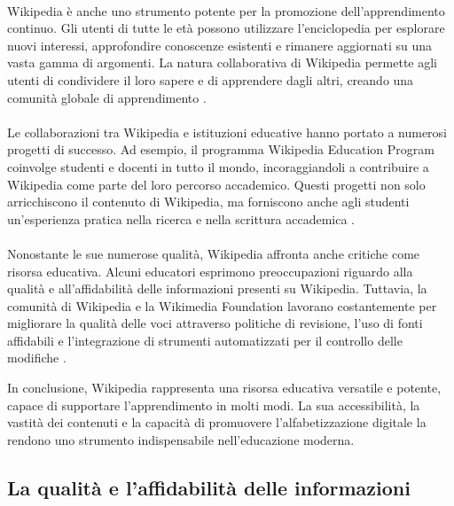 \documentclass[12pt,a4paper]{report}
\begin{document}
\paragraph*{}
Wikipedia è anche uno strumento potente per la promozione dell'apprendimento continuo. Gli utenti di tutte le età possono utilizzare l'enciclopedia per esplorare nuovi interessi, approfondire conoscenze esistenti e rimanere aggiornati su una vasta gamma di argomenti. La natura collaborativa di Wikipedia permette agli utenti di condividere il loro sapere e di apprendere dagli altri, creando una comunità globale di apprendimento \cite{history_of_wikis}.

\paragraph*{}
Le collaborazioni tra Wikipedia e istituzioni educative hanno portato a numerosi progetti di successo. Ad esempio, il programma Wikipedia Education Program coinvolge studenti e docenti in tutto il mondo, incoraggiandoli a contribuire a Wikipedia come parte del loro percorso accademico. Questi progetti non solo arricchiscono il contenuto di Wikipedia, ma forniscono anche agli studenti un'esperienza pratica nella ricerca e nella scrittura accademica \cite{jemielniak2014wikipedia}.

\paragraph*{}
Nonostante le sue numerose qualità, Wikipedia affronta anche critiche come risorsa educativa. Alcuni educatori esprimono preoccupazioni riguardo alla qualità e all'affidabilità delle informazioni presenti su Wikipedia. Tuttavia, la comunità di Wikipedia e la Wikimedia Foundation lavorano costantemente per migliorare la qualità delle voci attraverso politiche di revisione, l'uso di fonti affidabili e l'integrazione di strumenti automatizzati per il controllo delle modifiche \cite{denning2005wikipedia}.

In conclusione, Wikipedia rappresenta una risorsa educativa versatile e potente, capace di supportare l'apprendimento in molti modi. La sua accessibilità, la vastità dei contenuti e la capacità di promuovere l'alfabetizzazione digitale la rendono uno strumento indispensabile nell'educazione moderna.

\subsection{La qualità e l'affidabilità delle informazioni}
\end{document}
